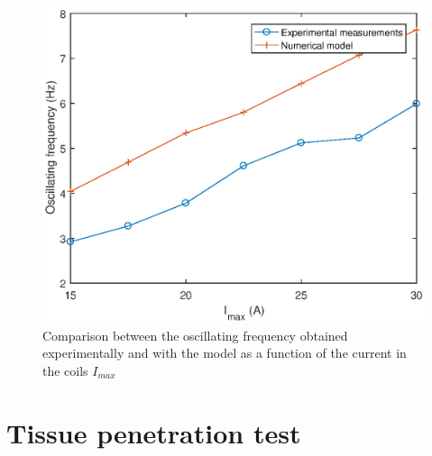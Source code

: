 \documentclass[letterpaper, 10 pt, conference]{ieeeconf}  %
\begin{document}
\begin{figure}
  \includegraphics[width=\linewidth]{figure3.eps}
  \caption{Comparison between the oscillating frequency obtained experimentally and with the model as a function of the current in the coils $I_{max}$}
  \label{freq}
\end{figure}


\section{Tissue penetration test}


\end{document}
